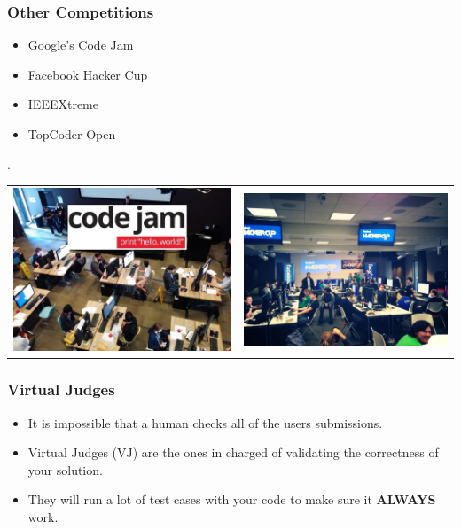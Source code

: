 \documentclass{beamer}
\begin{document}
\begin{frame}
	\frametitle{Other Competitions}

	\begin{itemize}
		\item Google's Code Jam
		\item Facebook Hacker Cup
		\item IEEEXtreme
		\item TopCoder Open
	\end{itemize}

	\begin{centering}
		\setlength\tabcolsep{15pt}.
		\begin{tabular}{ c c }
			\includegraphics[width=0.4\linewidth]{images/CodeJam} &
			\includegraphics[width=0.4\linewidth]{images/hackercup}
		\end{tabular}
	\end{centering}
\end{frame}

\begin{frame}
	\frametitle{Virtual Judges}

	\begin{itemize}
		\item It is impossible that a human checks all of the users submissions.
		\item Virtual Judges (VJ) are the ones in charged of validating the correctness of your solution.
		\item They will run a lot of test cases with your code to make sure it \textbf{ALWAYS} work.
	\end{itemize}
\end{frame}
\end{document}
